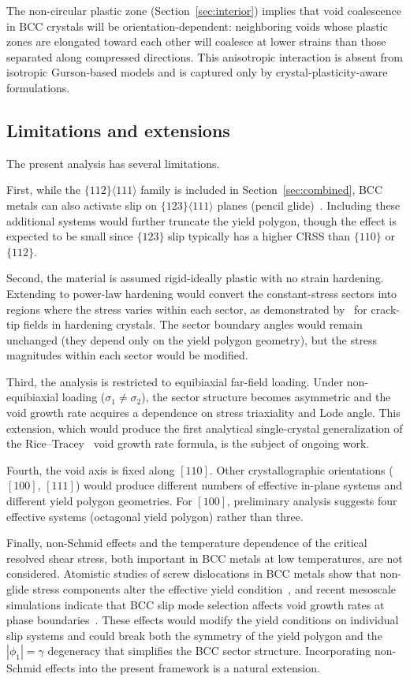 \documentclass{svjour3} %
\begin{document}
The non-circular plastic zone (Section~\ref{sec:interior}) implies that
void coalescence in BCC crystals will be orientation-dependent:
neighboring voids whose plastic zones are elongated toward each other
will coalesce at lower strains than those separated along compressed
directions. This anisotropic interaction is absent from isotropic
Gurson-based models and is captured only by crystal-plasticity-aware
formulations.

\subsection{Limitations and extensions}

The present analysis has several limitations.

First, while the $\{112\}\langle 111\rangle$ family is included in
Section~\ref{sec:combined}, BCC metals can also activate slip on
$\{123\}\langle 111\rangle$ planes (pencil
glide)~\citep{weinberger2013}. Including these additional systems
would further truncate the yield polygon, though the effect is expected
to be small since $\{123\}$ slip typically has a higher CRSS than
$\{110\}$ or $\{112\}$.

Second, the material is assumed rigid-ideally plastic with no strain
hardening. Extending to power-law hardening would convert the
constant-stress sectors into regions where the stress varies within each
sector, as demonstrated by~\citet{saeedvafa1989} for crack-tip fields
in hardening crystals. The sector boundary angles would remain
unchanged (they depend only on the yield polygon geometry), but the
stress magnitudes within each sector would be modified.

Third, the analysis is restricted to equibiaxial far-field loading. Under
non-equibiaxial loading ($\sigma_1 \neq \sigma_2$), the sector structure
becomes asymmetric and the void growth rate acquires a dependence on
stress triaxiality and Lode angle. This extension, which would produce
the first analytical single-crystal generalization of the
Rice--Tracey~\citep{rice1969} void growth rate formula, is the subject
of ongoing work.

Fourth, the void axis is fixed along $[110]$. Other crystallographic
orientations ($[100]$, $[111]$) would produce different numbers of
effective in-plane systems and different yield polygon geometries. For
$[100]$, preliminary analysis suggests four effective systems (octagonal
yield polygon) rather than three.

Finally, non-Schmid effects and the temperature dependence of the
critical resolved shear stress, both important in BCC metals at low
temperatures, are not considered. Atomistic studies of screw
dislocations in BCC metals show that non-glide stress components
alter the effective yield condition~\citep{qin1992, groger2024},
and recent mesoscale simulations indicate that BCC slip mode selection
affects void growth rates at phase boundaries~\citep{fei2025}. These
effects would modify the yield conditions on individual slip systems
and could break both the symmetry of the yield polygon and the
$|\phi_1| = \gamma$ degeneracy that simplifies the BCC sector structure.
Incorporating non-Schmid effects into the present framework is a
natural extension.
\end{document}
